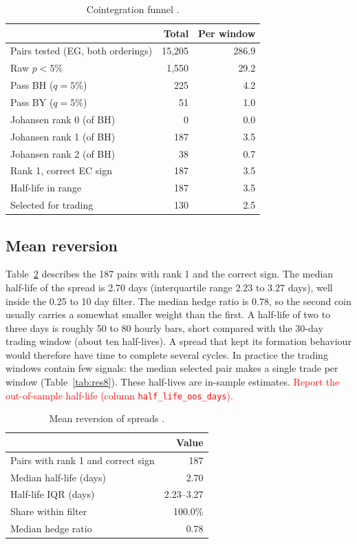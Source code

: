 \documentclass[10pt,a4paper,twocolumn]{article}
\newcommand{\TBD}[1]{\textcolor{red}{#1}}
\begin{document}
\begin{table}[htbp]
	\centering
	\small
	\caption{Cointegration funnel .}
	\label{tab:res2}
	\begin{tabularx}{\columnwidth}{@{}Xrr@{}}
		\toprule
		& Total & Per window \\
		\midrule
		Pairs tested (EG, both orderings) & 15{,}205 & 286.9 \\
		Raw $p<5\%$ & 1{,}550 & 29.2 \\
		Pass BH ($q=5\%$) & 225 & 4.2 \\
		Pass BY ($q=5\%$) & 51 & 1.0 \\
		Johansen rank 0 (of BH) & 0 & 0.0 \\
		Johansen rank 1 (of BH) & 187 & 3.5 \\
		Johansen rank 2 (of BH) & 38 & 0.7 \\
		Rank 1, correct EC sign & 187 & 3.5 \\
		Half-life in range & 187 & 3.5 \\
		Selected for trading & 130 & 2.5 \\
		\bottomrule
	\end{tabularx}
\end{table}

\subsection{Mean reversion }
Table~\ref{tab:res3} describes the 187 pairs with rank 1 and the correct sign. The median half-life of the spread is 2.70 days (interquartile range 2.23 to 3.27 days), well inside the 0.25 to 10 day filter. The median hedge ratio is 0.78, so the second coin usually carries a somewhat smaller weight than the first. A half-life of two to three days is roughly 50 to 80 hourly bars, short compared with the 30-day trading window (about ten half-lives). A spread that kept its formation behaviour would therefore have time to complete several cycles. In practice the trading windows contain few signals: the median selected pair makes a single trade per window (Table~\ref{tab:res8}). These half-lives are in-sample estimates. \TBD{Report the out-of-sample half-life (column \texttt{half\_life\_oos\_days}).}

\begin{table}[htbp]
	\centering
	\small
	\caption{Mean reversion of spreads .}
	\label{tab:res3}
	\begin{tabularx}{\columnwidth}{@{}Xr@{}}
		\toprule
		& Value \\
		\midrule
		Pairs with rank 1 and correct sign & 187 \\
		Median half-life (days) & 2.70 \\
		Half-life IQR (days) & 2.23--3.27 \\
		Share within filter & 100.0\% \\
		Median hedge ratio & 0.78 \\
		\bottomrule
	\end{tabularx}
\end{table}
\end{document}

